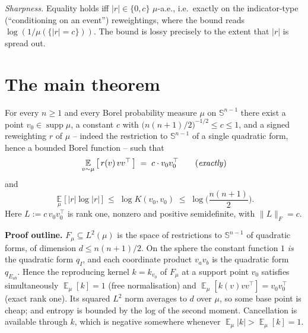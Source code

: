 \documentclass{aicr-solution}
\newcommand{\Expect}{\operatorname*{\mathbb{E}}}
\newcommand{\Sph}{\mathbb{S}^{n-1}}
\newcommand{\supp}{\operatorname{supp}}
\begin{document}
\smallskip
\noindent\emph{Sharpness.} Equality holds iff $|r| \in \{0,c\}$
$\mu$-a.e., i.e.\ exactly on the indicator-type (``conditioning on an
event'') reweightings, where the bound reads $\log(1/\mu(\{|r|=c\}))$.
The bound is lossy precisely to the extent that $|r|$ is spread out.

\section{The main theorem}\label{sec:main-thm}

\begin{theorem}\label{thm:main}
For every $n \ge 1$ and every Borel probability measure $\mu$ on
$\Sph$ there exist a point $v_{0} \in \supp\mu$, a constant $c$ with
$\big(n(n+1)/2\big)^{-1/2} \le c \le 1$, and a signed reweighting $r$
of $\mu$ -- indeed the restriction to $\Sph$ of a single quadratic
form, hence a bounded Borel function -- such that
\[
  \Expect_{v\sim\mu}\big[\, r(v)\,vv^{\top} \,\big] \;=\;
  c \cdot v_{0}v_{0}^{\top} \qquad \text{(\emph{exactly})}
\]
and
\[
  \Expect_{\mu}\big[\,|r|\log|r|\,\big] \;\le\; \log K(v_{0},v_{0})
  \;\le\; \log\Big(\frac{n(n+1)}{2}\Big).
\]
Here $L := c\,v_{0}v_{0}^{\top}$ is rank one, nonzero and positive
semidefinite, with $\|L\|_{F} = c$.
\end{theorem}

\smallskip
\noindent\textbf{Proof outline.} $F_{\mu} \subseteq L^{2}(\mu)$ is the
space of restrictions to $\Sph$ of quadratic forms, of dimension $d
\le n(n+1)/2$. On the sphere the constant function $1$ \emph{is} the
quadratic form $q_{I}$, and each coordinate product $v_{a}v_{b}$ is
the quadratic form $q_{E_{ab}}$. Hence the reproducing kernel $k =
k_{v_{0}}$ of $F_{\mu}$ at a support point $v_{0}$ satisfies
simultaneously $\Expect_{\mu}[k] = 1$ (free normalisation) and
$\Expect_{\mu}[k(v)vv^{\top}] = v_{0}v_{0}^{\top}$ (exact rank one).
Its squared $L^{2}$ norm averages to $d$ over $\mu$, so some base
point is cheap; and entropy is bounded by the log of the second
moment. Cancellation is available through $k$, which is negative
somewhere whenever $\Expect_{\mu}|k| > \Expect_{\mu}[k] = 1$.
\end{document}
